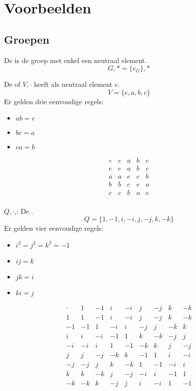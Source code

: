 \documentclass[main.tex]{subfiles}
\begin{document}
\chapter{Voorbeelden}
\label{cha:voorbeelden}

\section{Groepen}

\begin{de}
  De  is de groep met enkel een neutraal element.
  \[ G,* = \{ e_{G} \},* \]
\commj {}
\end{de}

\begin{de}
  De  of  $V,\cdot$ heeft als neutraal element $e$.
  \[ V = \{ e, a, b, c \} \]
  Er gelden drie eenvoudige regels: 
  \begin{itemize}
  \item $ab = c$
  \item $bc = a$
  \item $ca = b$
  \end{itemize}
  \[
  \begin{array}{c|cccc}
    \circ & e & a & b & c \\
    \hline
    e & e & a & b & c \\
    a & a & e & c & b \\
    b & b & c & e & a \\
    c & c & b & a & e \\
  \end{array}
  \]
\commj \cycln
\end{de}

\begin{de}
  $Q,\cdot$,: De .\\
  \[ Q = \{ 1,-1,i,-i,j,-j,k,-k \} \]
  Er gelden vier eenvoudige regels:
  \begin{itemize}
  \item $i^{2}=j^{2}=k^{2}= -1$
  \item $ij=k$
  \item $jk=i$
  \item $ki=j$
  \end{itemize}
  \[
  \begin{array}{r|rrrrrrrr}
    \cdot & 1 & -1 & i & -i & j & -j & k & -k\\
    \hline
    1 & 1 & -1 & i & -i & j & -j & k & -k\\
    -1 & -1 & 1 & -i & i & -j & j & -k & k\\
    i & i & -i & -1 & 1 & k & -k & -j & j\\
    -i & -i & i & 1 & -1 & -k & k & j & -j\\
    j & j & -j & -k & k & -1 & 1 & i & -i\\
    -j & -j & j & k & -k & 1 & -1 & -i & i\\
    k & k & -k & j & -j & -i & i & -1 & 1\\
    -k & -k & k & -j & j & i & -i & 1 & -1
  \end{array}
  \]
\commn \cycln
\end{de}
\end{document}
